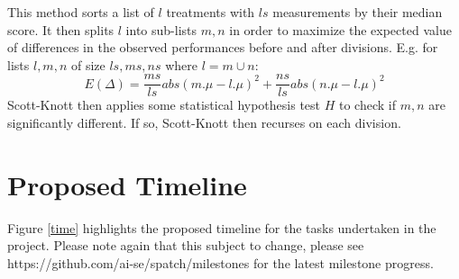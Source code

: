 \documentclass[]{sig-alternate}
\theoremstyle{break}
\begin{document}
This method sorts a list of $l$ treatments with $ls$ measurements by their median
score. It then
splits $l$ into sub-lists $m,n$ in order to maximize the expected value of
differences  in the observed performances
before and after divisions. E.g. for lists $l,m,n$ of size $ls,ms,ns$ where $l=m\cup n$:
\[E(\Delta)=\frac{ms}{ls}abs(m.\mu - l.\mu)^2 + \frac{ns}{ls}abs(n.\mu - l.\mu)^2\]
Scott-Knott then applies some statistical hypothesis test $H$ to check
if $m,n$ are significantly different. If so, Scott-Knott then recurses on each division.



\section{Proposed Timeline}

Figure \ref{time} highlights the proposed timeline for the tasks undertaken in the project. Please note again that this subject to change, please see https://github.com/ai-se/spatch/milestones for the latest milestone progress.\\
\pagebreak


\end{document}
